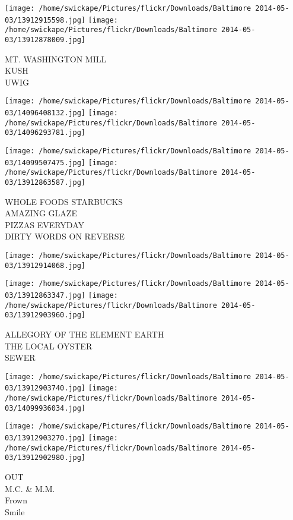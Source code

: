 \documentclass[10pt,letterpaper]{article}
\begin{document}
\vspace{0.25in}
\texttt{[image: /home/swickape/Pictures/flickr/Downloads/Baltimore 2014-05-03/13912915598.jpg]}
\texttt{[image: /home/swickape/Pictures/flickr/Downloads/Baltimore 2014-05-03/13912878009.jpg]}

MT. WASHINGTON MILL\\
KUSH\\
UWIG
\pagebreak

\texttt{[image: /home/swickape/Pictures/flickr/Downloads/Baltimore 2014-05-03/14096408132.jpg]}
\texttt{[image: /home/swickape/Pictures/flickr/Downloads/Baltimore 2014-05-03/14096293781.jpg]}

\texttt{[image: /home/swickape/Pictures/flickr/Downloads/Baltimore 2014-05-03/14099507475.jpg]}
\texttt{[image: /home/swickape/Pictures/flickr/Downloads/Baltimore 2014-05-03/13912863587.jpg]}

WHOLE FOODS STARBUCKS\\
AMAZING GLAZE\\
PIZZAS EVERYDAY\\
DIRTY WORDS ON REVERSE
\pagebreak

\texttt{[image: /home/swickape/Pictures/flickr/Downloads/Baltimore 2014-05-03/13912914068.jpg]}

\vspace{0.25in}
\texttt{[image: /home/swickape/Pictures/flickr/Downloads/Baltimore 2014-05-03/13912863347.jpg]}
\texttt{[image: /home/swickape/Pictures/flickr/Downloads/Baltimore 2014-05-03/13912903960.jpg]}

ALLEGORY OF THE ELEMENT EARTH\\
THE LOCAL OYSTER\\
SEWER
\pagebreak

\texttt{[image: /home/swickape/Pictures/flickr/Downloads/Baltimore 2014-05-03/13912903740.jpg]}
\texttt{[image: /home/swickape/Pictures/flickr/Downloads/Baltimore 2014-05-03/14099936034.jpg]}

\texttt{[image: /home/swickape/Pictures/flickr/Downloads/Baltimore 2014-05-03/13912903270.jpg]}
\texttt{[image: /home/swickape/Pictures/flickr/Downloads/Baltimore 2014-05-03/13912902980.jpg]}

OUT\\
M.C. \& M.M.\\
Frown\\
Smile
\pagebreak
\end{document}
